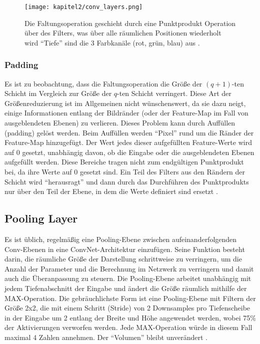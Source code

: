   \begin{figure}[H]
    \centering
    \texttt{[image: kapitel2/conv\_layers.png]}
    \caption[Die Faltung in einem CNN]{Die Faltungsoperation geschieht durch eine Punktprodukt Operation über des Filters, was über alle räumlichen Positionen wiederholt wird \enquote{Tiefe} sind die 3 Farbkanäle (rot, grün, blau) aus \cite*[321]{Aggarwal2018}.}
    \label{Kap2:Conv}
  \end{figure}

  \subsubsection{Padding}
  Es ist zu beobachtung, dass die Faltungsoperation die Größe der $(q + 1)$-ten Schicht im Vergleich zur Größe der $q$-ten Schicht verringert. Diese Art der Größenreduzierung ist im Allgemeinen nicht wünschenswert, da sie dazu neigt, einige Informationen entlang der Bildränder (oder der Feature-Map im Fall von ausgeblendeten Ebenen) zu verlieren. Dieses Problem kann durch Auffüllen (padding) gelöst werden. Beim Auffüllen werden  \enquote{Pixel} rund um die Ränder der Feature-Map hinzugefügt. Der Wert jedes dieser aufgefüllten Feature-Werte wird auf 0 gesetzt, unabhängig davon, ob die Eingabe oder die ausgeblendeten Ebenen aufgefüllt werden. Diese Bereiche tragen nicht zum endgültigen Punktprodukt bei, da ihre Werte auf 0 gesetzt sind. Ein Teil des Filters aus den Rändern der Schicht wird \enquote{herausragt} und dann durch das Durchführen des Punktprodukts nur über den Teil der Ebene, in dem die Werte definiert sind ersetzt \cite*[323]{Aggarwal2018}.


\subsection{Pooling Layer}
Es ist üblich, regelmäßig eine Pooling-Ebene zwischen aufeinanderfolgenden Conv-Ebenen in eine ConvNet-Architektur einzufügen. Seine Funktion besteht darin, die räumliche Größe der Darstellung schrittweise zu verringern, um die Anzahl der Parameter und die Berechnung im Netzwerk zu verringern und damit auch die Überanpassung zu steuern. Die Pooling-Ebene arbeitet unabhängig mit jedem Tiefenabschnitt der Eingabe und ändert die Größe räumlich mithilfe der MAX-Operation. Die gebräuchlichste Form ist eine Pooling-Ebene mit Filtern der Größe 2x2, die mit einem Schritt (Stride) von 2 Downsamples pro Tiefenscheibe in der Eingabe um 2 entlang der Breite und Höhe angewendet werden, wobei 75\% der Aktivierungen verworfen werden. Jede MAX-Operation würde in diesem Fall maximal 4 Zahlen annehmen. Der \enquote{Volumen} bleibt unverändert \cite*{StanfordUniversityCoursecs231n2018a}.

